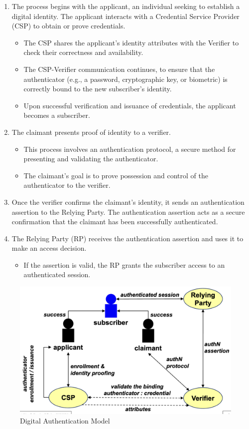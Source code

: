 \begin{enumerate}
    \item The process begins with the applicant, an individual seeking to establish a digital identity. The applicant interacts with a Credential Service Provider (CSP) to obtain or prove credentials.
\begin{itemize}
\item The CSP shares the applicant's identity attributes with the Verifier to check their correctness and availability.
\item The CSP-Verifier communication continues, to ensure that the authenticator (e.g., a password, cryptographic key, or biometric) is correctly bound to the new subscriber's identity.
\item Upon successful verification and issuance of credentials, the applicant becomes a subscriber.
\end{itemize}
    \item The claimant presents proof of identity to a verifier.
        \begin{itemize}
        \item This process involves an authentication protocol, a secure method for presenting and validating the authenticator.
        \item The claimant's goal is to prove possession and control of the authenticator to the verifier.
        \end{itemize}
    \item Once the verifier confirms the claimant's identity, it sends an authentication assertion to the Relying Party. The authentication assertion acts as a secure confirmation that the claimant has been successfully authenticated.
    \item The Relying Party (RP) receives the authentication assertion and uses it to make an access decision.
    \begin{itemize}
        \item If the assertion is valid, the RP grants the subscriber access to an authenticated session.
    \end{itemize}
\end{enumerate}

\begin{figure}[H]
    \centering
    \includegraphics[width=0.6\linewidth]{Images/Authentication/auth_model.png}
    \caption{Digital Authentication Model}
\end{figure}

